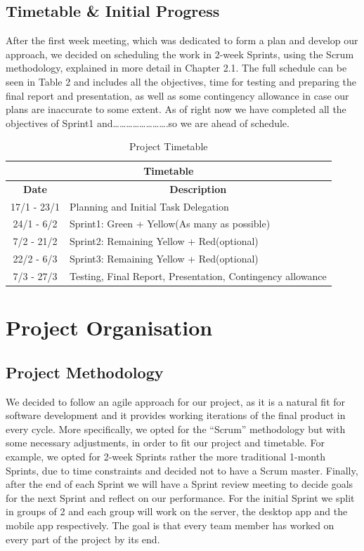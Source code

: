 \documentclass[11pt]{article}
\begin{document}
	\subsection{Timetable \& Initial Progress}
	After the first week meeting, which was dedicated to form a plan and develop our approach, we decided on scheduling the work in 2-week Sprints, using the Scrum methodology, explained in more detail in Chapter 2.1. The full schedule can be seen in Table 2 and includes all the objectives, time for testing and preparing the final report and presentation, as well as some contingency allowance in case our plans are inaccurate to some extent. As of right now we have completed all the objectives of Sprint1 and…………………….so we are ahead of schedule.\\
	\begin{table}[]
\begin{tabular}{|c|l|}
\hline
\multicolumn{2}{|c|}{\cellcolor[HTML]{38FFF8}\textbf{Timetable}}           \\ \hline
\textbf{Date} & \multicolumn{1}{c|}{\textbf{Description}}                  \\ \hline
17/1 - 23/1   & Planning and Initial Task Delegation                                                   \\ \hline
24/1 - 6/2    & Sprint1: Green + Yellow(As many as possible)               \\ \hline
7/2 - 21/2    & Sprint2: Remaining Yellow + Red(optional)                  \\ \hline
22/2 - 6/3    & Sprint3: Remaining Yellow + Red(optional)                  \\ \hline
7/3 - 27/3    & Testing, Final Report, Presentation, Contingency allowance \\ \hline
\end{tabular}
\caption{Project Timetable}
\end{table}
\section{Project Organisation}
	\subsection{Project Methodology}
	We decided to follow an agile approach for our project, as it is a natural fit for software development and it provides working iterations of the final product in every cycle. More specifically, we opted for the “Scrum” methodology but with some necessary adjustments, in order to fit our project and timetable. For example, we opted for 2-week Sprints rather the more traditional 1-month Sprints, due to time constraints and decided not to have a Scrum master. Finally, after the end of each Sprint we will have a Sprint review meeting to decide goals for the next Sprint and reflect on our performance. For the initial Sprint we split in groups of 2 and each group will work on the server, the desktop app and the mobile app respectively. The goal is that every team member has worked on every part of the project by its end.
\end{document}
